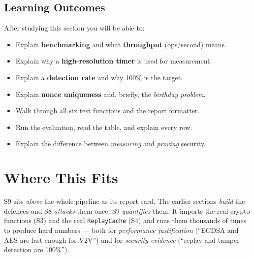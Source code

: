 \documentclass[11pt,a4paper]{report}
\begin{document}
\subsection*{Learning Outcomes}
After studying this section you will be able to:
\begin{itemize}
  \item Explain \textbf{benchmarking} and what \textbf{throughput} (ops/second) means.
  \item Explain why a \textbf{high-resolution timer} is used for measurement.
  \item Explain a \textbf{detection rate} and why 100\% is the target.
  \item Explain \textbf{nonce uniqueness} and, briefly, the \emph{birthday problem}.
  \item Walk through all six test functions and the report formatter.
  \item Run the evaluation, read the table, and explain every row.
  \item Explain the difference between \emph{measuring} and \emph{proving} security.
\end{itemize}

\section{Where This Fits}

S9 sits \emph{above} the whole pipeline as its report card. The earlier sections
\emph{build} the defences and S8 \emph{attacks} them once; S9 \emph{quantifies}
them. It imports the real crypto functions (S3) and the real
\texttt{ReplayCache} (S4) and runs them thousands of times to produce hard
numbers --- both for \emph{performance justification} (``ECDSA and AES are fast
enough for V2V'') and for \emph{security evidence} (``replay and tamper detection
are 100\%'').
\end{document}
